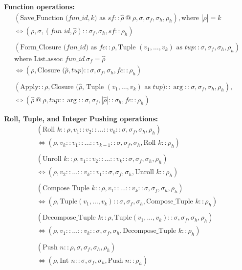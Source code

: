 \documentclass[11pt]{article}
\begin{document}
\textbf{Function operations:}
\begin{gather*}
    (\text{Save\_Function ($fun\_id, k$) as $sf$}::\hat{\rho}\ @\ \rho, \sigma, \sigma_f, \sigma_h, \rho_h), \text{where $|\hat{\rho}| = k$}\\
    \Longleftrightarrow (\rho, \sigma, (fun\_id, \hat{\rho})::\sigma_f, \sigma_h, sf::\rho_h)\\ \\
    (\text{Form\_Closure ($fun\_id$) as $fc$}::\rho, \text{Tuple $(v_1, \dots, v_k)$ as $tup$}::\sigma, \sigma_f, \sigma_h, \rho_h)\\ \text{where List.assoc $fun\_id\ \sigma_f = \hat{\rho}$}\\
    \Longleftrightarrow (\rho, \text{Closure ($\hat{\rho}, tup$)}::\sigma, \sigma_f, \sigma_h, fc::\rho_h)\\ \\ 
    (\text{Apply}::\rho, \text{Closure ($\hat{\rho}$, Tuple $(v_1, \dots, v_k)$ as $tup$)}::\arg::\sigma, \sigma_f, \sigma_h, \rho_h),\\     
    \Longleftrightarrow (\hat{\rho}\ @\ \rho, tup::\arg::\sigma, \sigma_f, |\hat{\rho}|::\sigma_h, fc::\rho_h)
\end{gather*}


\textbf{Roll, Tuple, and Integer Pushing operations:}
\begin{gather*}
    (\text{Roll $k$}::\rho, v_1::v_2::\dots::v_k::\sigma, \sigma_f, \sigma_h, \rho_h)\\
    \Longleftrightarrow (\rho, v_k::v_1::\dots::v_{k-1}::\sigma, \sigma_f, \sigma_h, \text{Roll $k$}::\rho_h)\\ \\
    (\text{Unroll $k$}::\rho, v_1::v_2::\dots::v_k::\sigma, \sigma_f, \sigma_h, \rho_h)\\
    \Longleftrightarrow (\rho, v_2::\dots::v_k::v_1::\sigma, \sigma_f, \sigma_h, \text{Unroll $k$}::\rho_h)\\ \\
    (\text{Compose\_Tuple $k$}::\rho, v_1:: \dots:: v_k::\sigma, \sigma_f, \sigma_h, \rho_h)\\
    \Longleftrightarrow (\rho, \text{Tuple}(v_1, \dots, v_k)::\sigma, \sigma_f, \sigma_h, \text{Compose\_Tuple $k$}::\rho_h)\\ \\
    (\text{Decompose\_Tuple $k$}::\rho, \text{Tuple}(v_1, \dots, v_k)::\sigma, \sigma_f, \sigma_h, \rho_h)\\
    \Longleftrightarrow (\rho, v_1::\dots::v_k::\sigma, \sigma_f, \sigma_h, \text{Decompose\_Tuple $k$}::\rho_h)\\ \\
    (\text{Push $n$}::\rho, \sigma, \sigma_f, \sigma_h, \rho_h)\\
    \Longleftrightarrow (\rho, \text{Int $n$}::\sigma, \sigma_f, \sigma_h, \text{Push $n$}::\rho_h)
\end{gather*}
\end{document}
